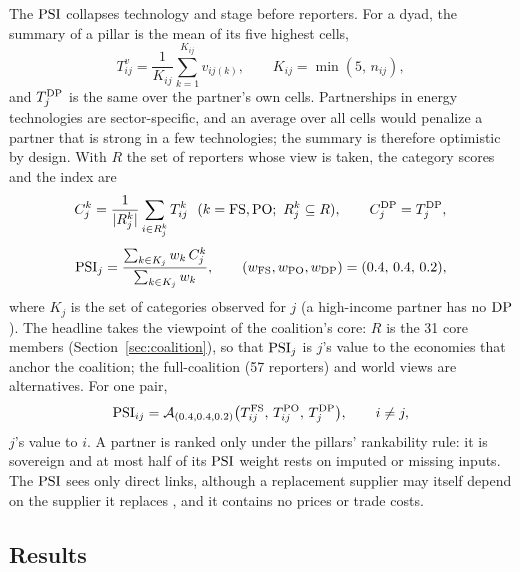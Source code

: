 The $\mathrm{PSI}$ collapses technology and stage before reporters. For a dyad, the summary of a pillar is
the mean of its five highest cells,
\begin{equation}\label{eq:top5}
  T^{v}_{ij}=\frac{1}{K_{ij}}\sum_{k=1}^{K_{ij}}v_{ij(k)},\qquad K_{ij}=\min(5,\,n_{ij}),
\end{equation}
and $T^{\mathrm{DP}}_{j}$ is the same over the partner's own cells. Partnerships in energy technologies are
sector-specific, and an average over all cells would penalize a partner that is strong in a few
technologies; the summary is therefore optimistic by design. With $R$ the set of reporters whose
view is taken, the category scores and the index are
\begin{equation}\label{eq:psi_category}
  C^{k}_j=\frac{1}{|R^{k}_j|}\sum_{i\in R^{k}_j}T^{k}_{ij}\ \ (k=\FS,\PO;\ R^{k}_j\subseteq R),
  \qquad C^{\DP}_j=T^{\DP}_{j},
\end{equation}
\begin{equation}\label{eq:psi}
  \mathrm{PSI}_j=\frac{\sum_{k\in K_j}w_k\,C^{k}_j}{\sum_{k\in K_j}w_k},\qquad
  (w_{\mathrm{FS}},w_{\mathrm{PO}},w_{\mathrm{DP}})=(0.4,\,0.4,\,0.2),
\end{equation}
where $K_j$ is the set of categories observed for $j$ (a high-income partner has no $\mathrm{DP}$). The
headline takes the viewpoint of the coalition's core: $R$ is the 31 core members
(Section~\ref{sec:coalition}), so that $\mathrm{PSI}_j$ is $j$'s value to the economies that anchor the
coalition; the full-coalition (57 reporters) and world views are alternatives. For one pair,
\begin{equation}\label{eq:psi_dyad}
  \mathrm{PSI}_{ij}=\mathcal{A}_{(0.4,0.4,0.2)}\bigl(T^{\mathrm{FS}}_{ij},\,T^{\mathrm{PO}}_{ij},\,T^{\mathrm{DP}}_{j}\bigr),
  \qquad i\neq j,
\end{equation}
$j$'s value to $i$. A partner is ranked only under the pillars' rankability rule: it is sovereign
and at most half of its $\mathrm{PSI}$ weight rests on imputed or missing inputs. The $\mathrm{PSI}$ sees only direct
links, although a replacement supplier may itself depend on the supplier it replaces
\citep{freund2024us,carvalho2021supply}, and it contains no prices or trade costs.

\subsection{Results}\label{subsec:bilateral_results}



